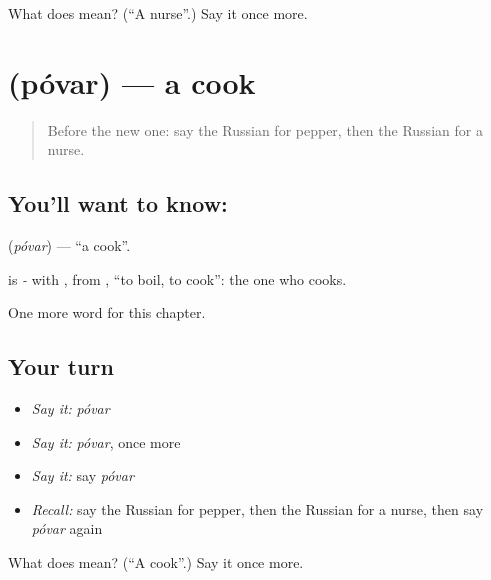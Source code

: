 \begin{tcolorbox}[breakable,colback=teal!4,colframe=teal!35!black,title={Before you move on}]
What does  mean? (\textquotedblleft{}A nurse\textquotedblright{}.) Say it once more.
\end{tcolorbox}
\section[\texorpdfstring{\ru{повар} (póvar)}{повар (póvar)}]{ (póvar) — a cook}

\label{lesson:RU-C107-cook}



\begin{quote}
Before the new one: say the Russian for pepper, then the Russian for a nurse.
\end{quote}

\subsection*{You'll want to know: }
\textbf{} (\emph{póvar}) — \textquotedblleft{}a cook\textquotedblright{}.

\begin{cousinweb}
\textbf{} is \emph{-} with \emph{}, from \emph{}, \textquotedblleft{}to boil, to cook\textquotedblright{}: the one who cooks.
\end{cousinweb}

\begin{grammarlens}[title={What you've built}]
One more word for this chapter.
\end{grammarlens}

\subsection*{Your turn}
\begin{itemize}
\raggedright
  \item \emph{Say it:} \emph{póvar}
  \item \emph{Say it:} \emph{póvar}, once more
  \item \emph{Say it:} say \emph{póvar}
  \item \emph{Recall:} say the Russian for pepper, then the Russian for a nurse, then say \emph{póvar} again
\end{itemize}

\begin{tcolorbox}[breakable,colback=teal!4,colframe=teal!35!black,title={Before you move on}]
What does  mean? (\textquotedblleft{}A cook\textquotedblright{}.) Say it once more.
\end{tcolorbox}
